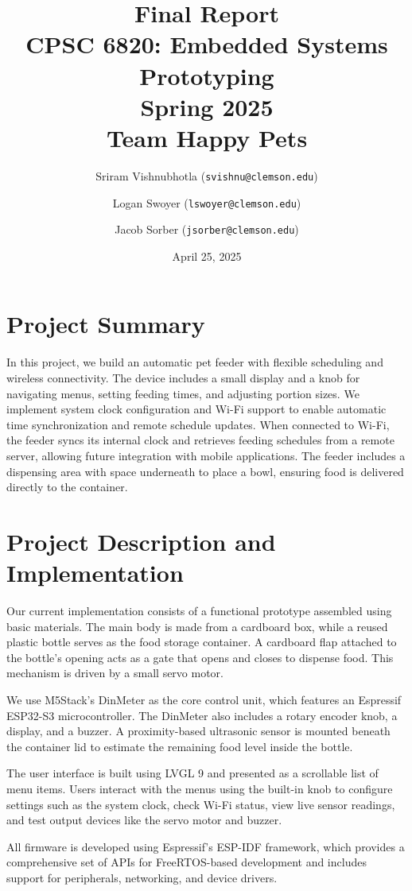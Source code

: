 \documentclass[12pt]{article}
\title{\textbf{Final Report} \\
CPSC 6820: Embedded Systems Prototyping \\
Spring 2025 \\
\Large Team Happy Pets}
\author{
Sriram Vishnubhotla (\texttt{svishnu@clemson.edu}) \and
Logan Swoyer (\texttt{lswoyer@clemson.edu}) \and
Jacob Sorber (\texttt{jsorber@clemson.edu})
}
\date{April 25, 2025}
\begin{document}
\maketitle

\section{Project Summary}
In this project, we build an automatic pet feeder with flexible scheduling and wireless connectivity. The device includes a small display and a knob for navigating menus, setting feeding times, and adjusting portion sizes. We implement system clock configuration and Wi-Fi support to enable automatic time synchronization and remote schedule updates. When connected to Wi-Fi, the feeder syncs its internal clock and retrieves feeding schedules from a remote server, allowing future integration with mobile applications. The feeder includes a dispensing area with space underneath to place a bowl, ensuring food is delivered directly to the container.
\section{Project Description and Implementation}
Our current implementation consists of a functional prototype assembled using basic materials. The main body is made from a cardboard box, while a reused plastic bottle serves as the food storage container. A cardboard flap attached to the bottle's opening acts as a gate that opens and closes to dispense food. This mechanism is driven by a small servo motor.

We use M5Stack's DinMeter as the core control unit, which features an Espressif ESP32-S3 microcontroller. The DinMeter also includes a rotary encoder knob, a display, and a buzzer. A proximity-based ultrasonic sensor is mounted beneath the container lid to estimate the remaining food level inside the bottle.

The user interface is built using LVGL 9 and presented as a scrollable list of menu items. Users interact with the menus using the built-in knob to configure settings such as the system clock, check Wi-Fi status, view live sensor readings, and test output devices like the servo motor and buzzer.

All firmware is developed using Espressif's ESP-IDF framework, which provides a comprehensive set of APIs for FreeRTOS-based development and includes support for peripherals, networking, and device drivers.
\end{document}

